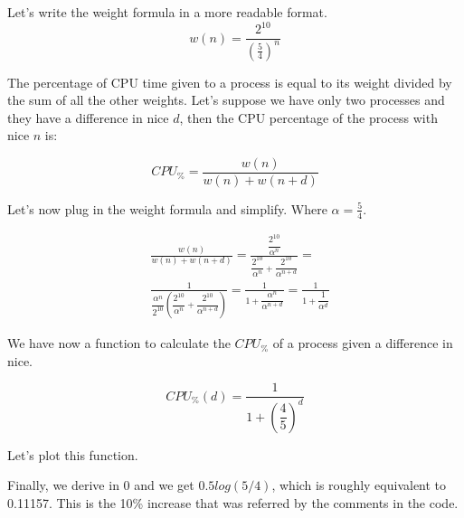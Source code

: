 \documentclass[10pt]{book}
\begin{document}

Let's write the weight formula in a more readable format.
\begin{equation}
    w(n) = \frac{2^{10}}{(\frac{5}{4})^{n}}
\end{equation}

The percentage of CPU time given to a process is equal to its weight divided by the sum of all the other weights. Let's suppose we have only two processes and they have a difference in nice $d$, then the CPU percentage of the process with nice $n$ is:

\begin{equation}
    CPU_\% = \frac{w(n)}{w(n)+w(n+d)}
\end{equation}

Let's now plug in the weight formula and simplify. Where $\alpha=\frac{5}{4}$. 

\begin{align*}
    &\frac{w(n)}{w(n)+w(n+d)} =
    \frac{\dfrac{2^{10}}{\alpha^{n}}}{\dfrac{2^{10}}{\alpha^{n}}+\dfrac{2^{10}}{\alpha^{n+d}}} =\\
    &\frac{1}{\dfrac{\alpha^{n}}{2^{10}} \left(\dfrac{2^{10}}{\alpha^{n}}+\dfrac{2^{10}}{\alpha^{n+d}}\right)} =
    \frac{1}{1+\dfrac{\alpha^{n}}{\alpha^{n+d}}} =
    \frac{1}{1+\dfrac{1}{\alpha^{d}}}
\end{align*}

We have now a function to calculate the $CPU_\%$ of a process given a difference in nice. 

\begin{equation}
    CPU_\%(d)=\frac{1}{1+\left(\dfrac{4}{5}\right)^{d}}
\end{equation}

Let's plot this function.


Finally, we derive in 0 and we get $0.5log(5/4)$, which is roughly equivalent to 0.11157. This is the 10\% increase that was referred by the comments in the code.
\end{document}

